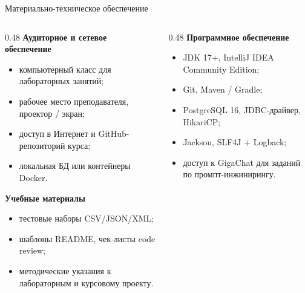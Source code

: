 \documentclass[aspectratio=169,10pt]{beamer}
\begin{document}
\begin{frame}{Материально-техническое обеспечение}
\footnotesize
\begin{columns}[T,onlytextwidth]
\begin{column}{0.48\textwidth}
\textbf{Аудиторное и сетевое обеспечение}
\begin{itemize}
  \item компьютерный класс для лабораторных занятий;
  \item рабочее место преподавателя, проектор / экран;
  \item доступ в Интернет и GitHub-репозиторий курса;
  \item локальная БД или контейнеры Docker.
\end{itemize}

\textbf{Учебные материалы}
\begin{itemize}
  \item тестовые наборы CSV/JSON/XML;
  \item шаблоны README, чек-листы code review;
  \item методические указания к лабораторным и курсовому проекту.
\end{itemize}
\end{column}
\begin{column}{0.48\textwidth}
\textbf{Программное обеспечение}
\begin{itemize}
  \item JDK 17+, IntelliJ IDEA Community Edition;
  \item Git, Maven / Gradle;
  \item PostgreSQL 16, JDBC-драйвер, HikariCP;
  \item Jackson, SLF4J + Logback;
  \item доступ к GigaChat для заданий по промпт-инжинирингу.
\end{itemize}
\end{column}
\end{columns}
\end{frame}
\end{document}
